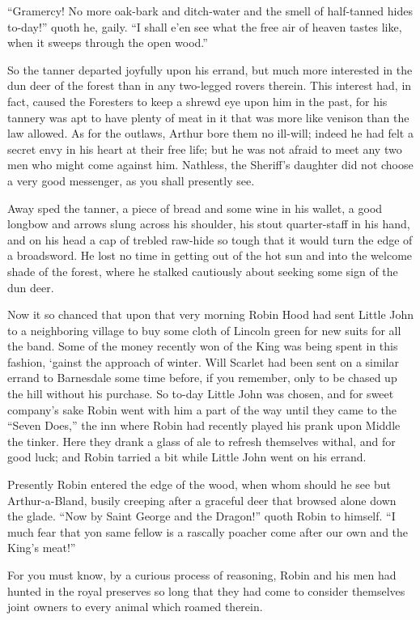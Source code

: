 ``Gramercy! No more oak-bark and ditch-water and the smell of
half-tanned hides to-day!'' quoth he, gaily. ``I shall e'en see what the
free air of heaven tastes like, when it sweeps through the open wood.''

So the tanner departed joyfully upon his errand, but much more
interested in the dun deer of the forest than in any two-legged rovers
therein. This interest had, in fact, caused the Foresters to keep a
shrewd eye upon him in the past, for his tannery was apt to have plenty
of meat in it that was more like venison than the law allowed. As for
the outlaws, Arthur bore them no ill-will; indeed he had felt a secret
envy in his heart at their free life; but he was not afraid to meet any
two men who might come against him. Nathless, the Sheriff's daughter did
not choose a very good messenger, as you shall presently see.

Away sped the tanner, a piece of bread and some wine in his wallet, a
good longbow and arrows slung across his shoulder, his stout
quarter-staff in his hand, and on his head a cap of trebled raw-hide so
tough that it would turn the edge of a broadsword. He lost no time in
getting out of the hot sun and into the welcome shade of the forest,
where he stalked cautiously about seeking some sign of the dun deer.

Now it so chanced that upon that very morning Robin Hood had sent Little
John to a neighboring village to buy some cloth of Lincoln green for new
suits for all the band. Some of the money recently won of the King was
being spent in this fashion, `gainst the approach of winter. Will
Scarlet had been sent on a similar errand to Barnesdale some time
before, if you remember, only to be chased up the hill without his
purchase. So to-day Little John was chosen, and for sweet company's sake
Robin went with him a part of the way until they came to the ``Seven
Does,'' the inn where Robin had recently played his prank upon Middle
the tinker. Here they drank a glass of ale to refresh themselves withal,
and for good luck; and Robin tarried a bit while Little John went on his
errand.

Presently Robin entered the edge of the wood, when whom should he see
but Arthur-a-Bland, busily creeping after a graceful deer that browsed
alone down the glade. ``Now by Saint George and the Dragon!'' quoth
Robin to himself. ``I much fear that yon same fellow is a rascally
poacher come after our own and the King's meat!''

For you must know, by a curious process of reasoning, Robin and his men
had hunted in the royal preserves so long that they had come to consider
themselves joint owners to every animal which roamed therein.

